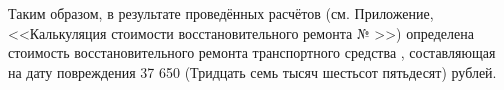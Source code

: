 %
\par Таким образом, в результате проведённых расчётов (см. Приложение, <<Калькуляция стоимости восстановительного ремонта № \NomerDoc>>) определена стоимость восстановительного ремонта транспортного средства  , составляющая на дату  повреждения 37 650 (Тридцать семь тысяч шестьсот пятьдесят) рублей.%
%



